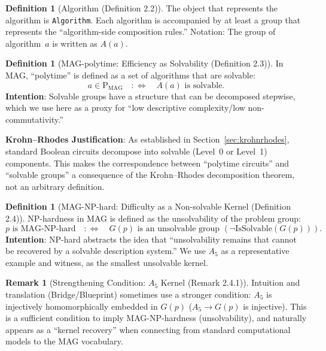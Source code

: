 \documentclass[11pt,a4paper]{article}
\theoremstyle{plain}
\theoremstyle{definition}
\newtheorem{definition}[theorem]{Definition}
\newtheorem{remark}[theorem]{Remark}
\newcommand{\MAG}{\mathrm{MAG}}
\newcommand{\Aalt}{A_5}
\newcommand{\IsSolvable}{\mathrm{IsSolvable}}
\newcommand{\lean}[1]{\texttt{#1}}
\begin{document}
\begin{definition}[Algorithm (Definition 2.2)]
The object that represents the algorithm is \lean{Algorithm}. Each algorithm is accompanied by at least a group that represents the ``algorithm-side composition rules.'' Notation: The group of algorithm~$a$ is written as $A(a)$.
\end{definition}

\begin{definition}[MAG-polytime: Efficiency as Solvability (Definition 2.3)]
In MAG, ``polytime'' is defined as a set of algorithms that are solvable:
\[
a \in \mathrm{P}_{\MAG} \quad :\Longleftrightarrow \quad A(a) \text{ is solvable.}
\]
\textbf{Intention}: Solvable groups have a structure that can be decomposed stepwise, which we use here as a proxy for ``low descriptive complexity/low non-commutativity.''

\textbf{Krohn--Rhodes Justification}: As established in Section~\ref{sec:krohnrhodes}, standard Boolean circuits decompose into solvable (Level~0 or Level~1) components. This makes the correspondence between ``polytime circuits'' and ``solvable groups'' a consequence of the Krohn--Rhodes decomposition theorem, not an arbitrary definition.
\end{definition}

\begin{definition}[MAG-NP-hard: Difficulty as a Non-solvable Kernel (Definition 2.4)]
NP-hardness in MAG is defined as the unsolvability of the problem group:
\[
p \text{ is MAG-NP-hard} \quad :\Longleftrightarrow \quad G(p) \text{ is an unsolvable group } (\neg \IsSolvable(G(p))).
\]
\textbf{Intention}: NP-hard abstracts the idea that ``unsolvability remains that cannot be recovered by a solvable description system.'' We use $\Aalt$ as a representative example and witness, as the smallest unsolvable kernel.
\end{definition}

\begin{remark}[Strengthening Condition: $\Aalt$ Kernel (Remark 2.4.1)]
Intuition and translation (Bridge/Blueprint) sometimes use a stronger condition: $\Aalt$ is injectively homomorphically embedded in $G(p)$ ($\Aalt \to G(p)$ is injective). This is a sufficient condition to imply MAG-NP-hardness (unsolvability), and naturally appears as a ``kernel recovery'' when connecting from standard computational models to the MAG vocabulary.
\end{remark}
\end{document}
